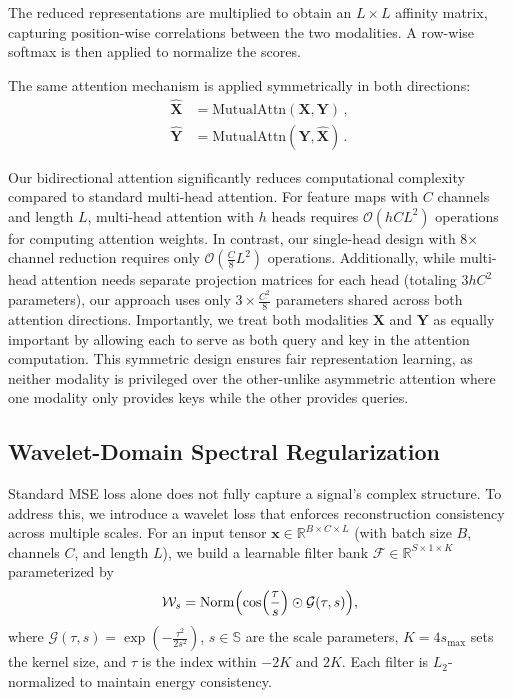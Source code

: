 \documentclass[conference]{IEEEtran}
\begin{document}
The reduced representations are multiplied to obtain an $L \times L$ affinity matrix, capturing position-wise correlations between the two modalities. A row-wise softmax is then applied to normalize the scores.

The same attention mechanism is applied symmetrically in both directions:
\begin{equation}
    \begin{aligned}
        \widehat{\mathbf{X}} & = \text{MutualAttn}(\mathbf{X}, \mathbf{Y})\,,           \\
        \widehat{\mathbf{Y}} & = \text{MutualAttn}(\mathbf{Y}, \widehat{\mathbf{X}})\,.
    \end{aligned}
\end{equation}

Our bidirectional attention significantly reduces computational complexity compared to standard multi-head attention. For feature maps with $C$ channels and length $L$, multi-head attention with $h$ heads requires $\mathcal{O}(hCL^2)$ operations for computing attention weights. In contrast, our single-head design with 8× channel reduction requires only $\mathcal{O}(\frac{C}{8}L^2)$ operations. Additionally, while multi-head attention needs separate projection matrices for each head (totaling $3hC^2$ parameters), our approach uses only $3 \times \frac{C^2}{8}$ parameters shared across both attention directions. Importantly, we treat both modalities $\mathbf{X}$ and $\mathbf{Y}$ as equally important by allowing each to serve as both query and key in the attention computation. This symmetric design ensures fair representation learning, as neither modality is privileged over the other-unlike asymmetric attention where one modality only provides keys while the other provides queries. 



\subsection{Wavelet-Domain Spectral Regularization}
\label{subsec:wavelet}

Standard MSE loss alone does not fully capture a signal's complex structure. To address this, we introduce a wavelet loss that enforces reconstruction consistency across multiple scales. For an input tensor $\mathbf{x}\in\mathbb{R}^{B\times C\times L}$ (with batch size $B$, channels $C$, and length $L$), we build a learnable filter bank $\mathcal{F}\in\mathbb{R}^{S\times 1\times K}$ parameterized by
\begin{equation}
    \label{eq:wavelet}
    \mathcal{W}_s = \operatorname{Norm}\Bigl(\cos\Bigl(\frac{\tau}{s}\Bigr) \odot \mathcal{G}(\tau,s)\Bigr),
\end{equation}
where $\mathcal{G}(\tau,s)=\exp\left(-\frac{\tau^2}{2s^2}\right)$, $s\in\mathbb{S}$ are the scale parameters, $K=4s_{\text{max}}$ sets the kernel size, and $\tau$ is the index within $-2K$ and $2K$. Each filter is $L_2$-normalized to maintain energy consistency.
\end{document}
